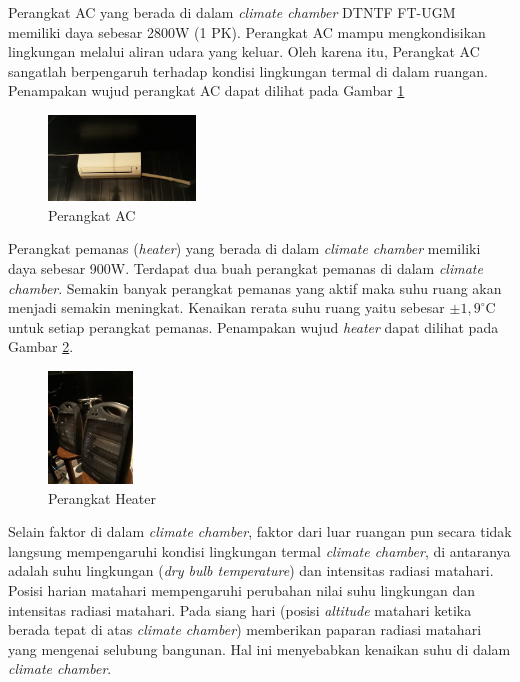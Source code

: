 Perangkat AC yang berada di dalam \textit{climate chamber} DTNTF FT-UGM memiliki daya sebesar 2800W (1 PK). Perangkat AC mampu mengkondisikan lingkungan melalui aliran udara yang keluar. Oleh karena itu, Perangkat AC sangatlah berpengaruh terhadap kondisi lingkungan termal di dalam ruangan. Penampakan wujud perangkat AC dapat dilihat pada Gambar \ref{fig:4:AC}

\begin{figure}[!h]
	\centering
	\includegraphics[width=0.35\textwidth]{figures/AC}
	\caption{Perangkat AC}
	\label{fig:4:AC}
\end{figure}

Perangkat pemanas (\textit{heater}) yang berada di dalam \textit{climate chamber} memiliki daya sebesar 900W. Terdapat dua buah perangkat pemanas di dalam \textit{climate chamber}. Semakin banyak perangkat pemanas yang aktif maka suhu ruang akan menjadi semakin meningkat. Kenaikan rerata suhu ruang yaitu sebesar $\pm1,9^\circ$C untuk setiap perangkat pemanas. Penampakan wujud \textit{heater} dapat dilihat pada Gambar \ref{fig:4:Heater}.

\begin{figure}[!h]
	\centering
	\includegraphics[width=0.2\textwidth]{figures/Heater}
	\caption{Perangkat Heater}
	\label{fig:4:Heater}
\end{figure}

Selain faktor di dalam \textit{climate chamber}, faktor dari luar ruangan pun secara tidak langsung mempengaruhi kondisi lingkungan termal \textit{climate chamber}, di antaranya adalah suhu lingkungan (\textit{dry bulb temperature}) dan intensitas radiasi matahari. Posisi harian matahari mempengaruhi perubahan nilai suhu lingkungan dan intensitas radiasi matahari. Pada siang hari (posisi \textit{altitude} matahari ketika berada tepat di atas \textit{climate chamber}) memberikan paparan radiasi matahari yang mengenai selubung bangunan. Hal ini menyebabkan kenaikan suhu di dalam \textit{climate chamber}.\\

